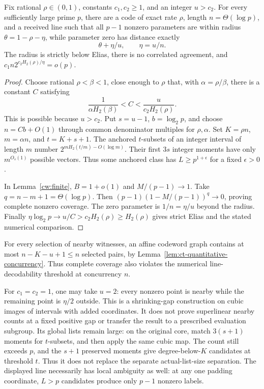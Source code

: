 \begin{theorem}
\label{cw:punctured-line}
Fix rational $\rho\in(0,1)$, constants $c_1,c_2\ge1$, and an integer
$u>c_2$. For every sufficiently large prime $p$, there are a code of
exact rate $\rho$, length $n=\Theta(\log p)$, and a received line
such that all $p-1$ nonzero parameters are within radius
$\theta=1-\rho-\eta$, while parameter zero has distance exactly
\[
 \theta+\eta/u,\qquad \eta=u/n.
\]
The radius is strictly below Elias, there is no correlated agreement,
and $c_1n2^{c_2H_2(\rho)/\eta}=o(p)$.
\end{theorem}
\begin{proof}
Choose rational $\rho<\beta<1$, close enough to $\rho$ that, with
$\alpha=\rho/\beta$, there is a constant $C$ satisfying
\[
 \frac1{\alpha H_2(\beta)}<C<\frac u{c_2H_2(\rho)}.
\]
This is possible because $u>c_2$. Put $s=u-1$, $b=\log_2p$,
and choose $n=Cb+O(1)$ through common denominator multiples for
$\rho,\alpha$. Set $K=\rho n$, $m=\alpha n$, and $t=K+s+1$.
The anchored $t$-subsets of an integer interval of length $m$ number
$2^{mH_2(t/m)-O(\log m)}$. Their first $3s$ integer moments have
only $m^{O_s(1)}$ possible vectors. Thus some anchored class has
$L\ge p^{1+\epsilon}$ for a fixed $\epsilon>0$.

In Lemma~\ref{cw:finite}, $B=1+o(1)$ and $M/(p-1)\to1$.
Take $q=n-m+1=\Theta(\log p)$. Then
$(p-1)(1-M/(p-1))^q\to0$, proving complete nonzero coverage.
The zero parameter is $1/n=\eta/u$ beyond the radius.
Finally $\eta\log_2p\to u/C>c_2H_2(\rho)\ge H_2(\rho)$ gives strict
Elias and the stated numerical comparison.
\end{proof}

For every selection of nearby witnesses, an affine codeword graph
contains at most $n-K-u+1\le n$ selected pairs, by
Lemma~\ref{lem:ct-quantitative-concurrency}. Thus complete coverage also
violates the numerical line-decodability threshold at concurrency $n$.

For $c_1=c_2=1$, one may take $u=2$: every nonzero point is nearby
while the remaining point is $\eta/2$ outside. This is a shrinking-gap
construction on cubic images of intervals with added coordinates.
It does not prove superlinear nearby counts at a fixed positive gap
or transfer the result to a prescribed evaluation subgroup.
Its global lists remain large: on the original core, match $3(s+1)$
moments for $t$-subsets, and then apply the same cubic map. The count
still exceeds $p$, and the $s+1$ preserved moments give degree-below-$K$
candidates at threshold $t$. Thus it does not replace the separate
actual-list-size separation. The displayed line necessarily has local
ambiguity as well: at any one padding coordinate, $L>p$ candidates
produce only $p-1$ nonzero labels.

